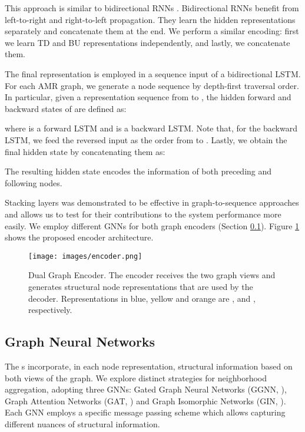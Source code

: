 \documentclass[11pt,a4paper]{article}
\begin{document}
This approach is similar to bidirectional RNNs \cite{Schuster97bidirectionalrecurrent}. Bidirectional RNNs benefit from left-to-right and right-to-left propagation. They learn the hidden representations separately and concatenate them at the end. We perform a similar encoding: first we learn TD and BU representations independently, and lastly, we concatenate them.

The final representation  is employed in a sequence input of a bidirectional LSTM. For each AMR graph, we generate a node sequence by depth-first traversal order. In particular, given a representation sequence from  to , the hidden forward and backward states of  are defined as:

where  is a forward LSTM and  is a backward LSTM.  Note that, for the backward LSTM, we feed the reversed input as the order from  to . Lastly, we obtain the final hidden state by concatenating them as:

The resulting hidden state  encodes the information of both preceding and following nodes.

Stacking layers was demonstrated to be effective in \mbox{graph-to-sequence} approaches \cite{marcheggiani-icnl18, rik_naacl19, damonte_naacl18} and allows us to test for their contributions to the system performance more easily. We employ different GNNs for both graph encoders (Section \ref{sec:gnn}). Figure \ref{fig:encoder} shows the proposed encoder architecture. 



\begin{figure}[t]
    \centering
    \texttt{[image: images/encoder.png]}
    \caption{Dual Graph Encoder. The encoder receives the two graph views and generates structural node representations that are used by the decoder. Representations in blue, yellow and orange are ,  and , respectively.}
    \label{fig:encoder}
\end{figure}


\subsection{Graph Neural Networks} \label{sec:gnn}


The s incorporate, in each node representation, structural information based on both views of the graph. We explore distinct strategies for neighborhood aggregation, adopting three GNNs: Gated Graph Neural Networks (GGNN, \citet{Li2016GatedGS}), Graph Attention Networks (GAT, \citet{velickovic2018graph}) and Graph Isomorphic Networks (GIN, \citet{xu2018how}). Each GNN employs a specific message passing scheme which allows capturing different nuances of structural information.
\end{document}
